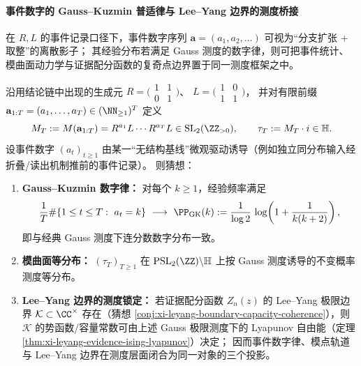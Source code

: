 \paragraph{事件数字的 Gauss--Kuzmin 普适律与 Lee--Yang 边界的测度桥接}
在 \(R,L\) 的事件记录口径下，事件数字序列 \(\mathbf a=(a_1,a_2,\dots)\) 可视为“分支扩张 + 取整”的离散影子；
其经验分布若满足 Gauss 测度的数字律，则可把事件统计、模曲面动力学与证据配分函数的复奇点边界置于同一测度框架之中。

\begin{conjecture}\label{conj:xi-gauss-kuzmin-event-digit-bridge}
沿用结论链中出现的生成元
\(
R=\bigl(\begin{smallmatrix}1&1\\0&1\end{smallmatrix}\bigr)
\)、
\(
L=\bigl(\begin{smallmatrix}1&0\\1&1\end{smallmatrix}\bigr)
\)，
并对有限前缀 \(\mathbf a_{1:T}=(a_1,\dots,a_T)\in(\NN_{\ge 1})^T\) 定义
\[
M_T:=M(\mathbf a_{1:T})=R^{a_1}L\cdots R^{a_T}L\in \mathrm{SL}_2(\ZZ_{>0}),
\qquad
\tau_T:=M_T\cdot i\in\mathbb H.
\]
设事件数字 \((a_t)_{t\ge 1}\) 由某一“无结构基线”微观驱动诱导（例如独立同分布输入经折叠/读出机制推前的事件记录）。
则猜想：
\begin{enumerate}
  \item \textbf{Gauss--Kuzmin 数字律：}
  对每个 \(k\ge 1\)，经验频率满足
  \[
  \frac{1}{T}\#\{1\le t\le T:\ a_t=k\}\ \longrightarrow\ 
  \PP_{\mathrm{GK}}(k)
  :=\frac{1}{\log 2}\,\log\!\left(1+\frac{1}{k(k+2)}\right),
  \]
  即与经典 Gauss 测度下连分数数字分布一致。
  \item \textbf{模曲面等分布：}
  \((\tau_T)_{T\ge 1}\) 在 \(\mathrm{PSL}_2(\ZZ)\backslash\mathbb H\) 上按 Gauss 测度诱导的不变概率测度等分布。
  \item \textbf{Lee--Yang 边界的测度锁定：}
  若证据配分函数 \(Z_n(z)\) 的 Lee--Yang 极限边界 \(\mathcal K\subset\CC^\times\) 存在（猜想 \ref{conj:xi-leyang-boundary-capacity-coherence}），则 \(\mathcal K\) 的势函数/容量常数可由上述 Gauss 极限测度下的 Lyapunov 自由能（定理 \ref{thm:xi-leyang-evidence-ising-lyapunov}）决定；
  因而事件数字律、模点轨道与 Lee--Yang 边界在测度层面闭合为同一对象的三个投影。
\end{enumerate}
\end{conjecture}

